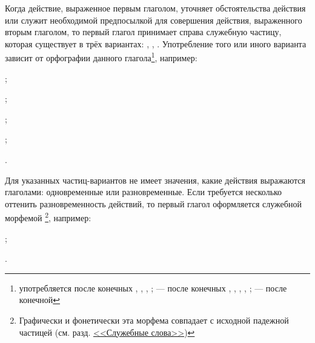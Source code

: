 Когда действие, выраженное первым глаголом, уточняет обстоятельства действия или служит необходимой предпосылкой для совершения действия, выраженного вторым глаголом, то первый глагол принимает справа служебную частицу, которая существует в трёх вариантах: , , . Употребление того или иного варианта зависит от орфографии данного глагола\footnote[36]{ употребляется после конечных , , , ;  --- после конечных , , , , ;  --- после конечной }, например:
\begin{prfsample}
	\item {};
	\item {};
	\item {};
	\item {};
	\item {}.
\end{prfsample}

Для указанных частиц-вариантов не имеет значения, какие действия выражаются глаголами: одновременные или разновременные. Если требуется несколько оттенить разновременность действий, то первый глагол оформляется служебной морфемой \footnote[37]{Графически и фонетически эта морфема совпадает с исходной падежной частицей (см. разд. \hyperref[sec:ss]{<<Служебные слова>>})}, например:
\begin{prfsample}
	\item {};
	\item {}.
\end{prfsample}


